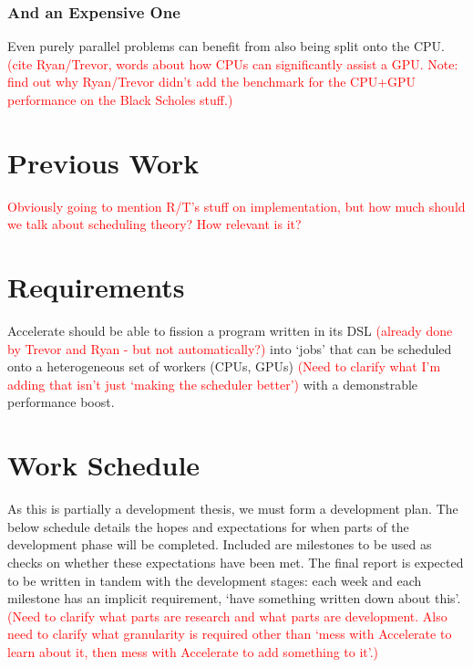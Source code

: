 \documentclass[a4paper,12pt]{article}
\newcommand{\red}[1]{\textcolor{red}{#1}}
\begin{document}
\subsubsection*{And an Expensive One}
Even purely parallel problems can benefit from also being split onto the CPU.
\red{(cite Ryan/Trevor, words about how CPUs can significantly assist a GPU. Note: find out why Ryan/Trevor didn't add the benchmark for the CPU+GPU performance on the Black Scholes stuff.)}


\section{Previous Work}

\red{Obviously going to mention R/T's stuff on implementation, but how much should we talk about scheduling theory? How relevant is it?}


\section{Requirements}

Accelerate should be able to fission a program written in its DSL \red{(already done by Trevor and Ryan - but not automatically?)} into `jobs' that can be scheduled onto a heterogeneous set of workers (CPUs, GPUs) \red{(Need to clarify what I'm adding that isn't just `making the scheduler better')} with a demonstrable performance boost.


\section{Work Schedule}

As this is partially a development thesis, we must form a development plan.
The below schedule details the hopes and expectations for when parts of the development phase will be completed.
Included are milestones to be used as checks on whether these expectations have been met.
The final report is expected to be written in tandem with the development stages: each week and each milestone has an implicit requirement, `have something written down about this'.
\red{(Need to clarify what parts are research and what parts are development. Also need to clarify what granularity is required other than `mess with Accelerate to learn about it, then mess with Accelerate to add something to it'.)}
\end{document}
